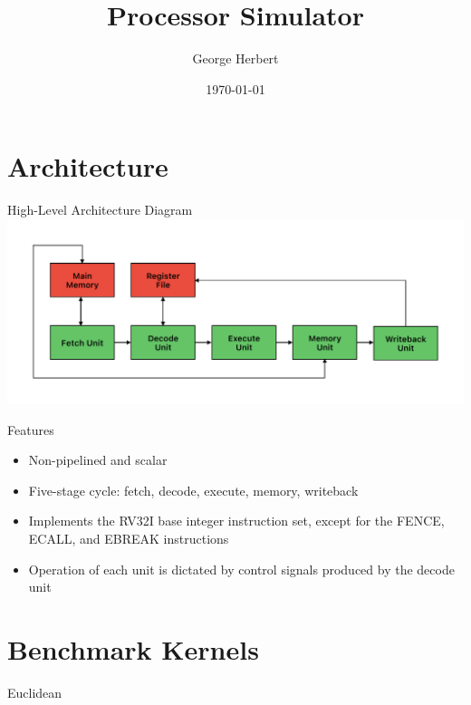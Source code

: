 \documentclass{beamer}
\title{Processor Simulator}
\author{George Herbert}
\date{\today}
\begin{document}
\begin{frame}
    \titlepage
\end{frame}

\section{Architecture}
\begin{frame}{High-Level Architecture Diagram}
    \includegraphics[width = \textwidth]{architecture.pdf}
\end{frame}

\begin{frame}{Features}
    \begin{itemize}
        \item Non-pipelined and scalar
        \item Five-stage cycle: fetch, decode, execute, memory, writeback
        \item Implements the RV32I base integer instruction set, except for the FENCE, ECALL, and EBREAK instructions
        \item Operation of each unit is dictated by control signals produced by the decode unit
    \end{itemize}
\end{frame}

\section{Benchmark Kernels}
\begin{frame}{Euclidean}
    
\end{frame}
\end{document}
